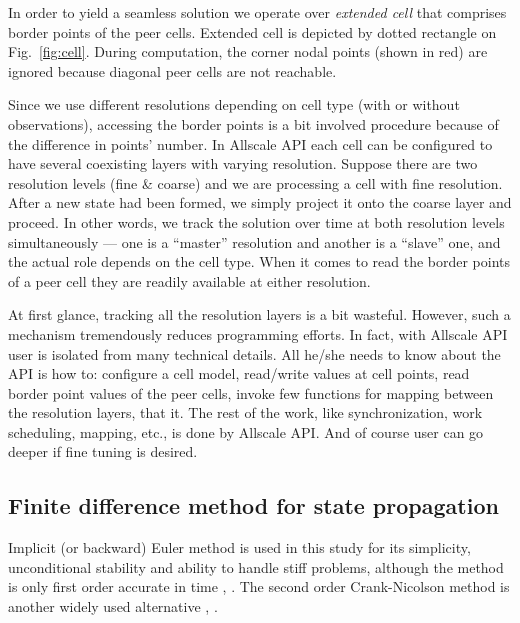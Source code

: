 \documentclass[acmsmall,review,anonymous]{acmart}\settopmatter{printfolios=true,printccs=false,printacmref=false}
\begin{document}
In order to yield a seamless solution we operate over \textit{extended cell} that comprises border points of the peer cells. Extended cell is depicted by dotted rectangle on Fig.~\ref{fig:cell}. During computation, the corner nodal points (shown in red) are ignored because diagonal peer cells are not reachable.

Since we use different resolutions depending on cell type (with or without observations), accessing the border points is a bit involved procedure because of the difference in points' number. In Allscale API each cell can be configured to have several coexisting layers with varying resolution. Suppose there are two resolution levels (fine \& coarse) and we are processing a cell with fine resolution. After a new state had been formed, we simply project it onto the coarse layer and proceed. In other words, we track the solution over time at both resolution levels simultaneously --- one is a ``master'' resolution and another is a ``slave'' one, and the actual role depends on the cell type. When it comes to read the border points of a peer cell they are readily available at either resolution.

At first glance, tracking all the resolution layers is a bit wasteful. However, such a mechanism tremendously reduces programming efforts. In fact, with Allscale API user is isolated from many technical details. All he/she needs to know about the API is how to: configure a cell model, read/write values at cell points, read border point values of the peer cells, invoke few functions for mapping between the resolution layers, that it. The rest of the work, like synchronization, work scheduling, mapping, etc., is done by Allscale API. And of course user can go deeper if fine tuning is desired.

\subsection{Finite difference method for state propagation\label{sec:finit-diff}}

Implicit (or backward) Euler method is used in this study for its simplicity, unconditional stability and ability to handle stiff problems, although the method is only first order accurate in time \cite{Sauer11}, \cite{Butcher03}. The second order Crank-Nicolson method is another widely used alternative \cite{Crank47}, \cite{Thomas95}.
\end{document}
